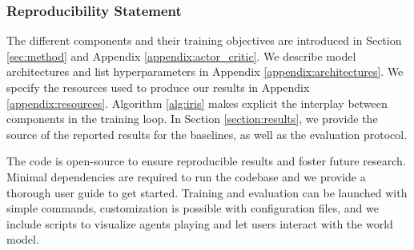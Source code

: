 \subsubsection*{Reproducibility Statement}
\label{section:reproducibility}

The different components and their training objectives are introduced in Section \ref{sec:method} and Appendix \ref{appendix:actor_critic}. We describe model architectures and list hyperparameters in Appendix \ref{appendix:architectures}. We specify the resources used to produce our results in Appendix \ref{appendix:resources}. Algorithm \ref{alg:iris} makes explicit the interplay between components in the training loop. In Section \ref{section:results}, we provide the source of the reported results for the baselines, as well as the evaluation protocol.    

The code is open-source to ensure reproducible results and foster future research. Minimal dependencies are required to run the codebase and we provide a thorough user guide to get started. Training and evaluation can be launched with simple commands, customization is possible with configuration files, and we include scripts to visualize agents playing and let users interact with the world model.     
